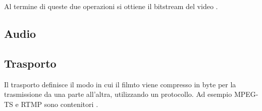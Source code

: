 Al termine di queste due operazioni si ottiene il bitstream del video \parencite{jurgem_1997}.




\subsection{Audio}




\subsection{Trasporto}
Il trasporto definisce il modo in cui il filmto viene compresso in byte per la trasmissione da una parte all'altra, utilizzando un protocollo. Ad esempio MPEG-TS e RTMP sono contenitori \parencite{CombinedICTTechnologies}.


